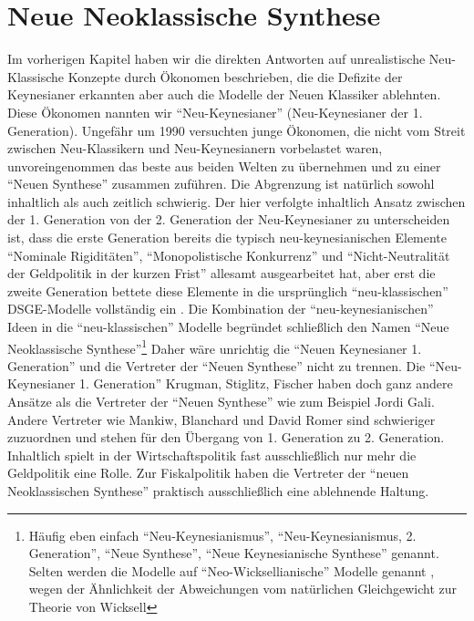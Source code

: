 %
%
%

\chapter{Neue Neoklassische Synthese}
\label{Neue Neoklassische Synthese}

Im vorherigen Kapitel haben wir die direkten Antworten auf unrealistische Neu-Klassische Konzepte durch Ökonomen beschrieben, die die Defizite der Keynesianer erkannten aber auch die Modelle der Neuen Klassiker ablehnten. Diese Ökonomen nannten wir "`Neu-Keynesianer"' (Neu-Keynesianer der 1. Generation). Ungefähr um 1990 versuchten junge Ökonomen, die nicht vom Streit zwischen Neu-Klassikern und Neu-Keynesianern vorbelastet waren, unvoreingenommen das beste aus beiden Welten zu übernehmen und zu einer "`Neuen Synthese"' zusammen zuführen. Die Abgrenzung ist natürlich sowohl inhaltlich als auch zeitlich schwierig. Der hier verfolgte inhaltlich Ansatz zwischen der 1. Generation von der 2. Generation der Neu-Keynesianer zu unterscheiden ist, dass die erste Generation bereits die typisch neu-keynesianischen Elemente "`Nominale Rigiditäten"', "`Monopolistische Konkurrenz"' und "`Nicht-Neutralität der Geldpolitik in der kurzen Frist"' allesamt ausgearbeitet hat, aber erst die zweite Generation bettete diese Elemente in die ursprünglich "`neu-klassischen"' DSGE-Modelle vollständig ein \parencite[S. 6]{Gali2015}. Die Kombination der "`neu-keynesianischen"' Ideen in die "`neu-klassischen"' Modelle begründet schließlich den Namen "`Neue Neoklassische Synthese"'\footnote{Häufig eben einfach "`Neu-Keynesianismus"', "`Neu-Keynesianismus, 2. Generation"', "`Neue Synthese"', "`Neue Keynesianische Synthese"' genannt. Selten werden die Modelle auf "`Neo-Wicksellianische"' Modelle genannt \parencite[S. 28]{Gali2007}, wegen der Ähnlichkeit der Abweichungen vom natürlichen Gleichgewicht zur Theorie von Wicksell} Daher wäre unrichtig die "`Neuen Keynesianer 1. Generation"' und die Vertreter der "`Neuen Synthese"' nicht zu trennen. Die "`Neu-Keynesianer 1. Generation"' Krugman, Stiglitz, Fischer haben doch ganz andere Ansätze als die Vertreter der "`Neuen Synthese"' wie zum Beispiel Jordi Gali. Andere Vertreter wie Mankiw, Blanchard und David Romer sind schwieriger zuzuordnen und stehen für den Übergang von 1. Generation zu 2. Generation. 
Inhaltlich spielt in der Wirtschaftspolitik fast ausschließlich nur mehr die Geldpolitik eine Rolle. Zur Fiskalpolitik haben die Vertreter der "`neuen Neoklassischen Synthese"' praktisch ausschließlich eine ablehnende Haltung.

